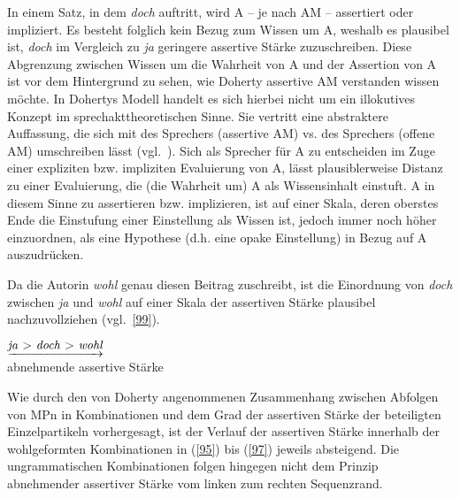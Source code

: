In einem Satz, in dem \textit{doch} auftritt, wird A – je nach AM – assertiert oder impliziert. Es besteht folglich kein Bezug zum Wissen um A, weshalb es plausibel ist, \textit{doch} im Vergleich zu \textit{ja} geringere assertive Stärke zuzuschreiben. Diese Abgrenzung zwischen Wissen um die Wahrheit von A und der Assertion von A ist  vor dem Hintergrund zu sehen, wie Doherty assertive AM verstanden wissen möchte. In Dohertys Modell handelt es sich hierbei nicht um ein illokutives Konzept im sprechakttheoretischen Sinne. Sie vertritt eine abstraktere Auffassung, die sich mit  des Sprechers (assertive AM) vs.  des Sprechers (offene AM) umschreiben lässt (vgl.\ \citealt[19]{Doherty1987}). Sich als Sprecher für A zu entscheiden im Zuge einer expliziten bzw. impliziten Evaluie\-rung von A, lässt plausiblerweise Distanz zu einer Evaluierung, die (die Wahrheit um) A als Wissensinhalt einstuft. A in diesem Sinne zu assertieren bzw. implizieren, ist auf einer Skala, deren oberstes Ende die Einstufung einer Einstellung als Wissen ist, jedoch immer noch höher einzuordnen, als eine Hypothese (d.h. eine opake Einstellung) in Bezug auf A auszudrücken. 

Da die Autorin\textit{ wohl} genau diesen Beitrag zuschreibt, ist die Einordnung von \textit{doch} zwischen \textit{ja} und \textit{wohl} auf einer Skala der assertiven Stärke  plausibel nachzuvollziehen (vgl.\ \ref{99}).

\begin{exe}
	\ex\label{99} 
	$\underrightarrow{\text{\textit{ja} > \textit{doch} > \textit{wohl}}}$\\
	abnehmende assertive Stärke
\end{exe}
Wie durch den von Doherty angenommenen Zusammenhang zwischen Abfolgen von MPn in Kombinationen und dem Grad der assertiven Stärke der beteiligten Einzelpartikeln vorhergesagt, ist der Verlauf der assertiven Stärke innerhalb der wohlgeformten Kombinationen in (\ref{95}) bis (\ref{97}) jeweils absteigend. Die ungrammatischen Kombinationen folgen hingegen nicht dem Prinzip abnehmender assertiver Stärke vom linken zum rechten Sequenzrand.

